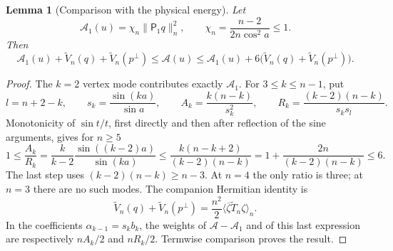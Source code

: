 \documentclass[11pt,reqno]{amsart}
\numberwithin{equation}{section}
\newtheorem{lemma}[theorem]{Lemma}
\theoremstyle{definition}
\theoremstyle{remark}
\newcommand{\A}{\mathcal A}
\newcommand{\av}[1]{\langle #1\rangle_n}
\newcommand{\norm}[1]{\lVert #1\rVert}
\begin{document}
\begin{lemma}[Comparison with the physical energy]\label{lem:energy-comparison}
Let
\[
 \A_1(u)=\chi_n\norm{\mathsf P_1q}_n^2,
 \qquad \chi_n=\frac{n-2}{2n\cos^2a}\le1.
\]
Then
\begin{equation}\label{eq:energy-comparison}
 \A_1(u)+\widetilde V_n(q)+\widetilde V_n(p^\perp)
 \le\A(u)
 \le\A_1(u)+6\bigl(\widetilde V_n(q)+\widetilde V_n(p^\perp)\bigr).
\end{equation}
\end{lemma}
\begin{proof}
The $k=2$ vertex mode contributes exactly $\A_1$. For $3\le k\le n-1$, put
\[
 l=n+2-k,\qquad s_k=\frac{\sin(ka)}{\sin a},\qquad
 A_k=\frac{k(n-k)}{s_k^2},\qquad R_k=\frac{(k-2)(n-k)}{s_ks_l}.
\]
Monotonicity of $\sin t/t$, first directly and then after reflection of the sine arguments, gives for $n\ge5$
\begin{equation}\label{eq:one-ratio}
 1\le\frac{A_k}{R_k}
 =\frac{k}{k-2}\frac{\sin((k-2)a)}{\sin(ka)}
 \le\frac{k(n-k+2)}{(k-2)(n-k)}
 =1+\frac{2n}{(k-2)(n-k)}\le6.
\end{equation}
The last step uses $(k-2)(n-k)\ge n-3$. At $n=4$ the only ratio is three; at $n=3$ there are no such modes. The companion Hermitian identity is
\[
 \widetilde V_n(q)+\widetilde V_n(p^\perp)
 =\frac{n^2}{2}\av{\overline\zeta\widetilde T_n\zeta}.
\]
In the coefficients $\alpha_{k-1}=s_kb_k$, the weights of $\A-\A_1$ and of this last expression are respectively $nA_k/2$ and $nR_k/2$. Termwise comparison proves the result.
\end{proof}
\end{document}
